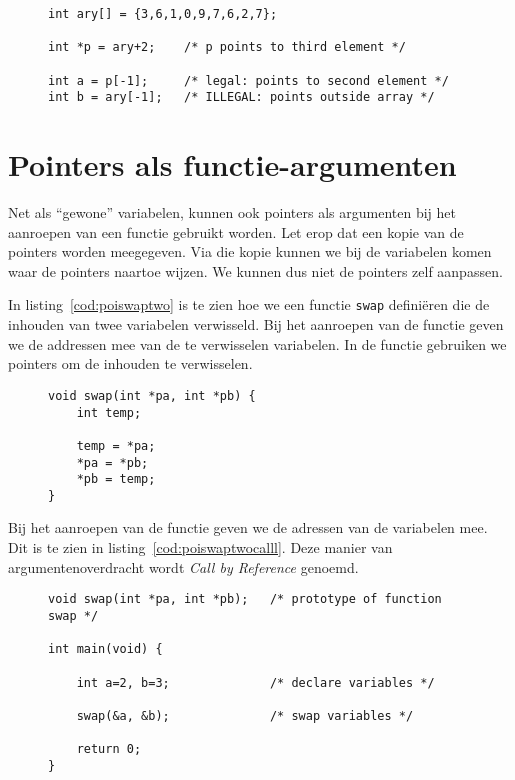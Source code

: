 \begin{figure}[!ht]
\begin{lstlisting}[caption=Pointer die naar een element in een array wijst.,label=cod:poipointstonegeindex]
int ary[] = {3,6,1,0,9,7,6,2,7};

int *p = ary+2;    /* p points to third element */

int a = p[-1];     /* legal: points to second element */
int b = ary[-1];   /* ILLEGAL: points outside array */
\end{lstlisting}
\end{figure}

\section{Pointers als functie-argumenten}
\label{sec:pointersalsfunctieargumenten}
Net als ``gewone'' variabelen, kunnen ook pointers als argumenten bij het aanroepen van een functie gebruikt worden. Let erop dat een kopie van de pointers worden meegegeven. Via die kopie kunnen we bij de variabelen komen waar de pointers naartoe wijzen. We kunnen dus niet de pointers zelf aanpassen.

In listing~\ref{cod:poiswaptwo} is te zien hoe we een functie \texttt{swap} definiëren die de inhouden van twee variabelen verwisseld. Bij het aanroepen van de functie geven we de addressen mee van de te verwisselen variabelen. In de functie gebruiken we pointers om de inhouden te verwisselen.

\begin{figure}[!ht]
\begin{lstlisting}[caption=Het verwisselen van twee variabelen met behulp van pointers.,label=cod:poiswaptwo]
void swap(int *pa, int *pb) {
	int temp;

    temp = *pa;
    *pa = *pb;
    *pb = temp;
}
\end{lstlisting}
\end{figure}

Bij het aanroepen van de functie geven we de adressen van de variabelen mee. Dit is te zien in listing~\ref{cod:poiswaptwocalll}. Deze manier van argumentenoverdracht wordt \textsl{Call by Reference} genoemd.

\begin{figure}[!ht]
\begin{lstlisting}[caption=Aanroep van de functie.,label=cod:poiswaptwocalll]
void swap(int *pa, int *pb);   /* prototype of function swap */

int main(void) {

    int a=2, b=3;              /* declare variables */

    swap(&a, &b);              /* swap variables */

    return 0;
}
\end{lstlisting}
\end{figure}

